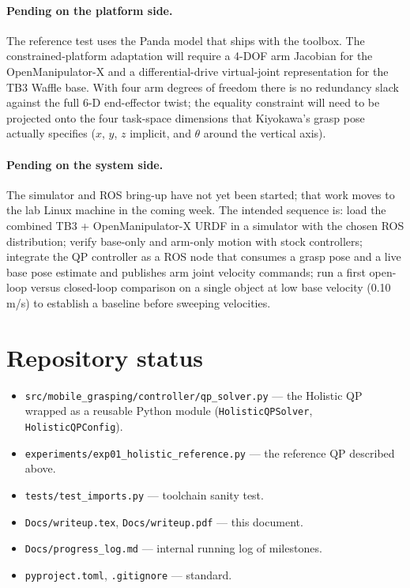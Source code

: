 \documentclass[11pt]{article}
\begin{document}
\paragraph{Pending on the platform side.} The reference test uses the
Panda model that ships with the toolbox. The constrained-platform
adaptation will require a 4-DOF arm Jacobian for the OpenManipulator-X
and a differential-drive virtual-joint representation for the TB3
Waffle base. With four arm degrees of freedom there is no redundancy
slack against the full 6-D end-effector twist; the equality constraint
will need to be projected onto the four task-space dimensions that
Kiyokawa's grasp pose actually specifies ($x$, $y$, $z$ implicit, and
$\theta$ around the vertical axis).

\paragraph{Pending on the system side.} The simulator and ROS bring-up
have not yet been started; that work moves to the lab Linux machine in
the coming week. The intended sequence is: load the combined
TB3 + OpenManipulator-X URDF in a simulator with the chosen ROS
distribution; verify base-only and arm-only motion with stock
controllers; integrate the QP controller as a ROS node that consumes a
grasp pose and a live base pose estimate and publishes arm joint
velocity commands; run a first open-loop versus closed-loop comparison
on a single object at low base velocity (0.10\,m/s) to establish a
baseline before sweeping velocities.

\section{Repository status}

\begin{itemize}[noitemsep]
  \item \texttt{src/mobile\_grasping/controller/qp\_solver.py} --- the
        Holistic QP wrapped as a reusable Python module
        (\texttt{HolisticQPSolver}, \texttt{HolisticQPConfig}).
  \item \texttt{experiments/exp01\_holistic\_reference.py} --- the
        reference QP described above.
  \item \texttt{tests/test\_imports.py} --- toolchain sanity test.
  \item \texttt{Docs/writeup.tex}, \texttt{Docs/writeup.pdf} --- this
        document.
  \item \texttt{Docs/progress\_log.md} --- internal running log of
        milestones.
  \item \texttt{pyproject.toml}, \texttt{.gitignore} --- standard.
\end{itemize}
\end{document}
